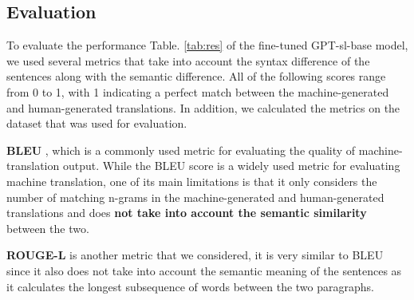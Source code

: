 \documentclass[fleqn,moreauthors,10pt]{ds_report}
\begin{document}
\subsection*{Evaluation}

To evaluate the performance Table. \ref{tab:res} of the fine-tuned GPT-sl-base model, we used several metrics that take into account the syntax difference of the sentences along with the semantic difference. All of the following scores range from 0 to 1, with 1 indicating a perfect match between the machine-generated and human-generated translations. In addition, we calculated the metrics on the dataset that was used for evaluation.
\par
\textbf{BLEU} \cite{Papineni2002BleuAM}, which is a commonly used metric for evaluating the quality of machine-translation output. 
While the BLEU score is a widely used metric for evaluating machine translation, one of its main limitations is that it only considers the number of matching n-grams in the machine-generated and human-generated translations and does \textbf{not take into account the semantic similarity} between the two.
\par \textbf{ROUGE-L} \cite{rougel} is another metric that we considered, it is very similar to BLEU since it also does not take into account the semantic meaning of the sentences as it calculates the longest subsequence of words between the two paragraphs. 
\end{document}
